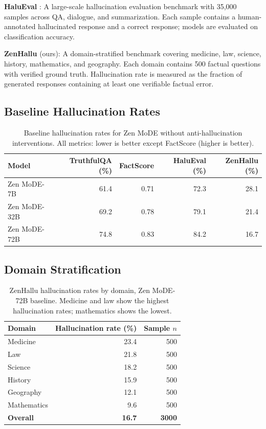 \documentclass[11pt,a4paper]{article}
\begin{document}
\textbf{HaluEval} \cite{li2023halueval}: A large-scale hallucination evaluation benchmark
with 35,000 samples across QA, dialogue, and summarization. Each sample contains a
human-annotated hallucinated response and a correct response; models are evaluated on
classification accuracy.

\textbf{ZenHallu} (ours): A domain-stratified benchmark covering medicine, law, science,
history, mathematics, and geography. Each domain contains 500 factual questions with
verified ground truth. Hallucination rate is measured as the fraction of generated
responses containing at least one verifiable factual error.

\subsection{Baseline Hallucination Rates}

\begin{table}[H]
\centering
\caption{Baseline hallucination rates for Zen MoDE without anti-hallucination
interventions. All metrics: lower is better except FactScore (higher is better).}
\begin{tabular}{lrrrr}
\toprule
\textbf{Model} & \textbf{TruthfulQA (\%)} & \textbf{FactScore} & \textbf{HaluEval (\%)} & \textbf{ZenHallu (\%)} \\
\midrule
Zen MoDE-7B  & 61.4 & 0.71 & 72.3 & 28.1 \\
Zen MoDE-32B & 69.2 & 0.78 & 79.1 & 21.4 \\
Zen MoDE-72B & 74.8 & 0.83 & 84.2 & 16.7 \\
\bottomrule
\end{tabular}
\label{tab:baseline}
\end{table}

\subsection{Domain Stratification}

\begin{table}[H]
\centering
\caption{ZenHallu hallucination rates by domain, Zen MoDE-72B baseline. Medicine and
law show the highest hallucination rates; mathematics shows the lowest.}
\begin{tabular}{lrr}
\toprule
\textbf{Domain} & \textbf{Hallucination rate (\%)} & \textbf{Sample $n$} \\
\midrule
Medicine    & 23.4 & 500 \\
Law         & 21.8 & 500 \\
Science     & 18.2 & 500 \\
History     & 15.9 & 500 \\
Geography   & 12.1 & 500 \\
Mathematics & 9.6  & 500 \\
\textbf{Overall} & \textbf{16.7} & \textbf{3000} \\
\bottomrule
\end{tabular}
\label{tab:domain}
\end{table}
\end{document}
